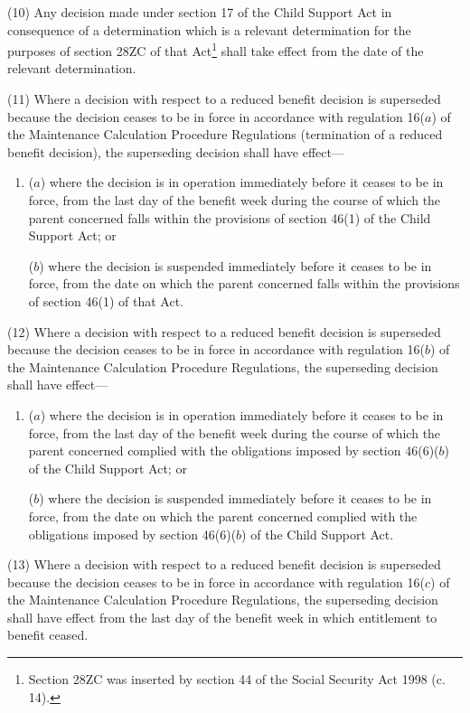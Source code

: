 \documentclass[12pt,a4paper]{article}
\begin{document}
{(10) Any decision made under section 17 of the Child Support Act in consequence of a determination which is a relevant determination for the purposes of section 28ZC of that Act\footnote{\frenchspacing Section 28ZC was inserted by section 44 of the Social Security Act 1998 (c. 14).} shall take effect from the date of the relevant determination.

(11) Where a decision with respect to a reduced benefit decision is superseded because the decision ceases to be in force in accordance with regulation 16($a$)  of the Maintenance Calculation Procedure Regulations (termination of a reduced benefit decision), the superseding decision shall have effect—
\begin{enumerate}\item[]
($a$) where the decision is in operation immediately before it ceases to be in force, from the last day of the benefit week during the course of which the parent concerned falls within the provisions of section 46(1) of the Child Support Act; or

($b$) where the decision is suspended immediately before it ceases to be in force, from the date on which the parent concerned falls within the provisions of section 46(1) of that Act.
\end{enumerate}

(12) Where a decision with respect to a reduced benefit decision is superseded because the decision ceases to be in force in accordance with regulation 16($b$)  of the Maintenance Calculation Procedure Regulations, the superseding decision shall have effect—
\begin{enumerate}\item[]
($a$) where the decision is in operation immediately before it ceases to be in force, from the last day of the benefit week during the course of which the parent concerned complied with the obligations imposed by section 46(6)($b$)  of the Child Support Act; or

($b$) where the decision is suspended immediately before it ceases to be in force, from the date on which the parent concerned complied with the obligations imposed by section 46(6)($b$)  of the Child Support Act.
\end{enumerate}

(13) Where a decision with respect to a reduced benefit decision is superseded because the decision ceases to be in force in accordance with regulation 16($c$)  of the Maintenance Calculation Procedure Regulations, the superseding decision shall have effect from the last day of the benefit week in which entitlement to benefit ceased.

}
\end{document}
